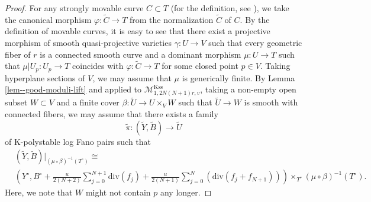 \documentclass[12pt,twoside]{amsart}
\theoremstyle{definition}
\begin{document}
\begin{proof}
    For any strongly movable curve $C\subset T$ (for the definition, see \cite[Definition 1.3]{BDPP}), we take the canonical morphism $\varphi\colon \tilde{C}\to T$ from the normalization $\tilde{C}$ of $C$.
    By the definition of movable curves, it is easy to see that there exist a projective morphism of smooth quasi-projective varieties $\gamma\colon U\to V$ such that every geometric fiber of $r$ is a connected smooth curve and a dominant morphism $\mu\colon U\to T$ such that $\mu|{U_{p}}\colon U_p\to T$ coincides with $\varphi\colon \tilde{C}\to T$ for some closed point $p\in V$.
    Taking hyperplane sections of $V$, we may assume that $\mu$ is generically finite.
By Lemma \ref{lem--good-moduli-lift} and \cite[Theorem A.8]{AHLH} applied to $\mathcal{M}^{\mathrm{Kss}}_{1,2N(N+1)r,v}$, taking a non-empty open subset $W\subset V$ and a finite cover $\beta\colon \tilde{U}\to U\times_VW$ such that $\tilde{U}\to W$ is smooth with connected fibers, we may assume that there exists a family
\[
\tilde{\pi}\colon (\tilde{Y},\tilde{B})\to \tilde{U}
\]
of K-polystable log Fano pairs such that
\begin{align*}
&(\tilde{Y},\tilde{B})|_{(\mu\circ\beta)^{-1}(T^\circ)}\cong \\
&\left(Y^\circ,B^\circ+\frac{u}{2(N+2)}\sum^{N+1}_{j=0}\mathrm{div}(f_{j})+\frac{u}{2(N+1)}\sum^{N}_{j=0}(\mathrm{div}(f_{j}+f_{N+1}))\right)\times_{T^\circ}(\mu\circ\beta)^{-1}(T^\circ).
\end{align*}
Here, we note that $W$ might not contain $p$ any longer.
    

\end{proof}
\end{document}
